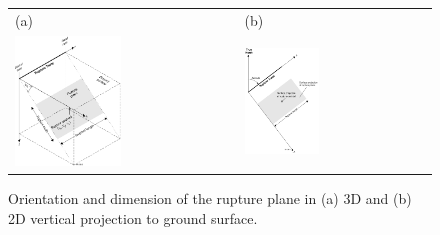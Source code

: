 \begin{figure}[htp]
\begin{center}
\begin{tabular}{ll}
(a) & (b) \\
\includegraphics[width=0.49\textwidth]{diags/fig-hrupture-3d} &
\includegraphics[width=0.41\textwidth]{diags/fig-hrupture-2d}
\end{tabular}
\end{center}
\caption{Orientation and dimension of the rupture plane in (a) 3D
and (b) 2D vertical projection to ground surface.}
\label{fig:hrupture-3d}
\end{figure}




